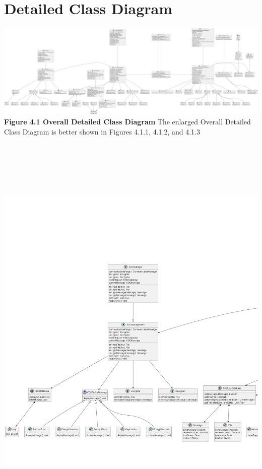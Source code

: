 \documentclass[]{article}
\begin{document}
\section{Detailed Class Diagram}
\label{sec:detailed_class_diagram}

\begin{center}
	\includegraphics[width=\textwidth]{../images/ClassDiagram/FullClass.png}
	\textbf{Figure 4.1 Overall Detailed Class Diagram}
	\newline The enlarged Overall Detailed Class Diagram is better shown in Figures 4.1.1, 4.1.2, and 4.1.3
	\includegraphics[width=\textwidth,height=8in]{../images/ClassDiagram/left.png}

\end{center}
\end{document}
